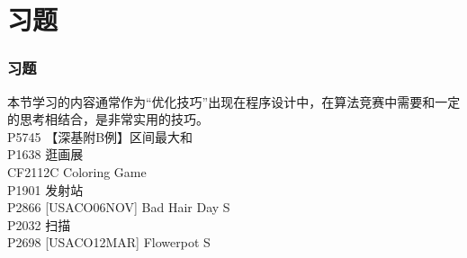 \documentclass{beamer}
\begin{document}
\section{习题}
\begin{frame}
\frametitle{习题}
本节学习的内容通常作为“优化技巧”出现在程序设计中，在算法竞赛中需要和一定的思考相结合，是非常实用的技巧。\\
P5745 【深基附B例】区间最大和 \\ 
P1638 逛画展 \\
CF2112C Coloring Game \\
P1901 发射站 \\
P2866 [USACO06NOV] Bad Hair Day S \\ 
P2032 扫描\\
P2698 [USACO12MAR] Flowerpot S \\
\end{frame}
\end{document}
